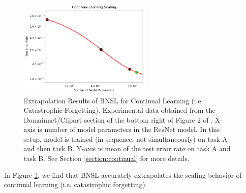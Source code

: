 \documentclass{article} %
\begin{document}
\begin{figure}[htbp]
    \centering
\includegraphics[width=0.58\textwidth]{figures/continual_learning/continual_vision.png}

    \caption{
Extrapolation Results of BNSL for Continual Learning (i.e. Catastrophic Forgetting). Experimental data obtained from the Domainnet/Clipart section of the bottom right of Figure 2 of \cite{ramasesh2022effect}. X-axis is number of model parameters in the ResNet model. In this setup, model is trained (in sequence, not simultaneously) on task A and then task B. Y-axis is mean of the test error rate on task A and task B. See Section \ref{section:continual} for more details.
    }
    \label{fig:continual}
\end{figure}

In Figure \ref{fig:continual}, we find that BNSL accurately extrapolates the scaling behavior of continual learning (i.e. catastrophic forgetting).

\clearpage
\end{document}
